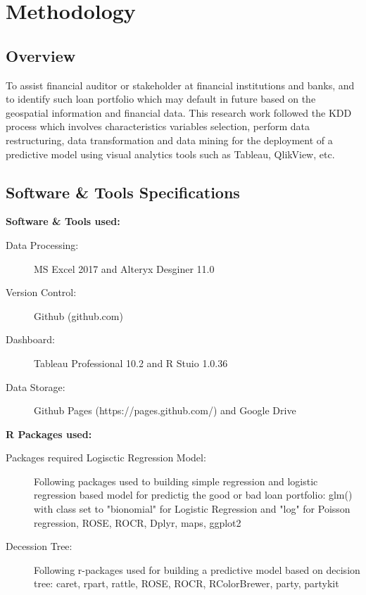 %
%
%
%

\chapter{Methodology}\label{C.Methodology}

\section{Overview}\label{S.Ch4.opening}
To assist financial auditor or stakeholder at financial institutions and banks, and to identify such loan portfolio which may default in future based on the geospatial information and financial data. This research work followed the KDD process which involves characteristics variables selection, perform data restructuring, data transformation and data mining for the deployment of a predictive model using visual analytics tools such as Tableau, QlikView, etc.


\section{Software \& Tools Specifications}\label{ch4.2}

\textbf{Software \& Tools used:}


\begin{description}
  \item[Data Processing:] MS Excel 2017 and Alteryx Desginer 11.0
  \item[Version Control:] Github (github.com)
  \item[Dashboard:] Tableau Professional 10.2 and R Stuio 1.0.36
  \item[Data Storage:] Github Pages (https://pages.github.com/) and Google Drive
\end{description}

\textbf{R Packages used:}\\

\begin{description}
  \item[Packages required Logisctic Regression Model:] Following packages used to building simple regression and logistic regression based model for predictig the good or bad loan portfolio: glm() with class set to "bionomial" for Logistic Regression and "log" for Poisson regression, ROSE, ROCR, Dplyr, maps, ggplot2
  \item[Decession Tree:] Following r-packages used for building a predictive model based on decision tree: caret, rpart, rattle, ROSE, ROCR, RColorBrewer, party, partykit

\end{description}

